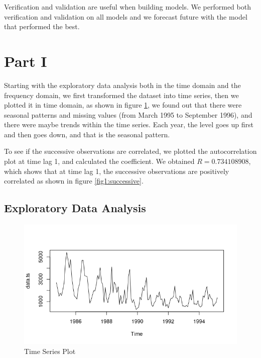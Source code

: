 \documentclass[journal, a4paper]{IEEEtran}
\begin{document}
Verification and validation are useful when building models. We performed both verification and validation on all models and we forecast future with the model that performed the best.
\section{Part I}


Starting with the exploratory data analysis both in the time domain and the frequency domain, we first transformed the dataset into time series, then we plotted it in time domain, as shown in figure \ref{fig1:data_ts}, we found out that there were seasonal patterns and missing values (from March 1995 to September 1996), and there were maybe trends within the time series. Each year, the level goes up first and then goes down, and that is the seasonal pattern.


To see if the successive observations are correlated, we plotted the autocorrelation plot at time lag 1, and calculated the coefficient. We obtained $R=0.734108908 $, which shows that at time lag 1, the successive observations are positively correlated as shown in figure \ref{fig1:successive}.

\subsection{Exploratory Data Analysis}
\begin{figure}[H]
\begin{center}
\includegraphics[scale=0.45]{fig1/data_ts.png}
\caption{Time Series Plot}
\label{fig1:data_ts}
\end{center}
\end{figure}
\end{document}
